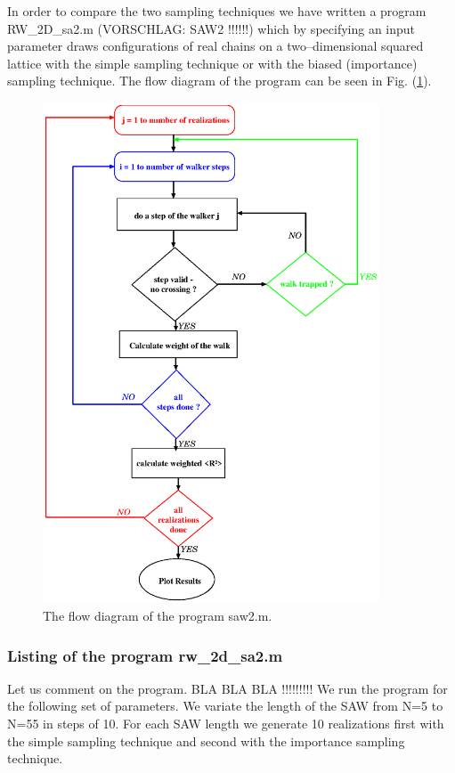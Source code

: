 In order to compare the two sampling techniques we have written a 
program {\sf RW\_2D\_sa2.m} (VORSCHLAG: SAW2 !!!!!!) 
which by specifying an input parameter
draws configurations of real chains on a two--dimensional squared lattice 
with the simple sampling 
technique or with the biased (importance) sampling technique.
The flow diagram of the program can be seen in Fig. 
(\ref{F_RW2D_ALGORITHM}).
\begin{figure}
\label{F_RW2D_ALGORITHM}
\includegraphics[width=10cm]{./Figures/f_rw2d_algorithm.eps}
\caption{The flow diagram of the program saw2.m.}
\end{figure}


\subsubsection{Listing of the program {\sf rw\_2d\_sa2.m}}

Let us comment on the program. BLA BLA BLA !!!!!!!!!
We run the program for the following set of parameters. We variate
the length of the SAW from N=5 to N=55 in steps of 10. For each
SAW length we generate 10 realizations first with the simple
sampling technique and second with the importance sampling 
technique. 

